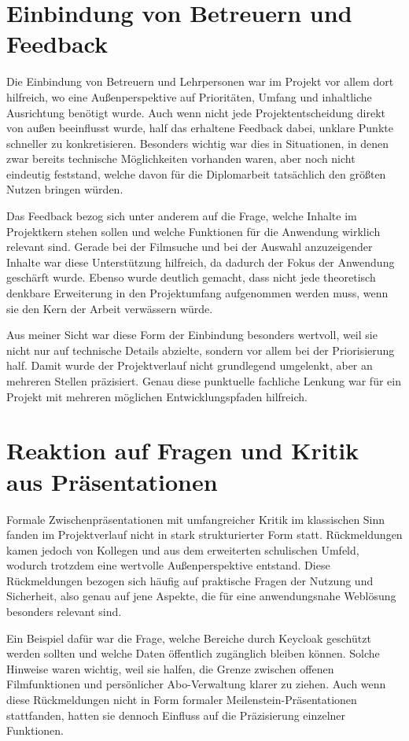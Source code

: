 \section{Einbindung von Betreuern und Feedback}
Die Einbindung von Betreuern und Lehrpersonen war im Projekt vor allem dort hilfreich, wo eine Außenperspektive auf Prioritäten, Umfang und inhaltliche Ausrichtung benötigt wurde. Auch wenn nicht jede Projektentscheidung direkt von außen beeinflusst wurde, half das erhaltene Feedback dabei, unklare Punkte schneller zu konkretisieren. Besonders wichtig war dies in Situationen, in denen zwar bereits technische Möglichkeiten vorhanden waren, aber noch nicht eindeutig feststand, welche davon für die Diplomarbeit tatsächlich den größten Nutzen bringen würden.

Das Feedback bezog sich unter anderem auf die Frage, welche Inhalte im Projektkern stehen sollen und welche Funktionen für die Anwendung wirklich relevant sind. Gerade bei der Filmsuche und bei der Auswahl anzuzeigender Inhalte war diese Unterstützung hilfreich, da dadurch der Fokus der Anwendung geschärft wurde. Ebenso wurde deutlich gemacht, dass nicht jede theoretisch denkbare Erweiterung in den Projektumfang aufgenommen werden muss, wenn sie den Kern der Arbeit verwässern würde.

Aus meiner Sicht war diese Form der Einbindung besonders wertvoll, weil sie nicht nur auf technische Details abzielte, sondern vor allem bei der Priorisierung half. Damit wurde der Projektverlauf nicht grundlegend umgelenkt, aber an mehreren Stellen präzisiert. Genau diese punktuelle fachliche Lenkung war für ein Projekt mit mehreren möglichen Entwicklungspfaden hilfreich.

\section{Reaktion auf Fragen und Kritik aus Präsentationen}
Formale Zwischenpräsentationen mit umfangreicher Kritik im klassischen Sinn fanden im Projektverlauf nicht in stark strukturierter Form statt. Rückmeldungen kamen jedoch von Kollegen und aus dem erweiterten schulischen Umfeld, wodurch trotzdem eine wertvolle Außenperspektive entstand. Diese Rückmeldungen bezogen sich häufig auf praktische Fragen der Nutzung und Sicherheit, also genau auf jene Aspekte, die für eine anwendungsnahe Weblösung besonders relevant sind.

Ein Beispiel dafür war die Frage, welche Bereiche durch Keycloak geschützt werden sollten und welche Daten öffentlich zugänglich bleiben können. Solche Hinweise waren wichtig, weil sie halfen, die Grenze zwischen offenen Filmfunktionen und persönlicher Abo-Verwaltung klarer zu ziehen. Auch wenn diese Rückmeldungen nicht in Form formaler Meilenstein-Präsentationen stattfanden, hatten sie dennoch Einfluss auf die Präzisierung einzelner Funktionen.

